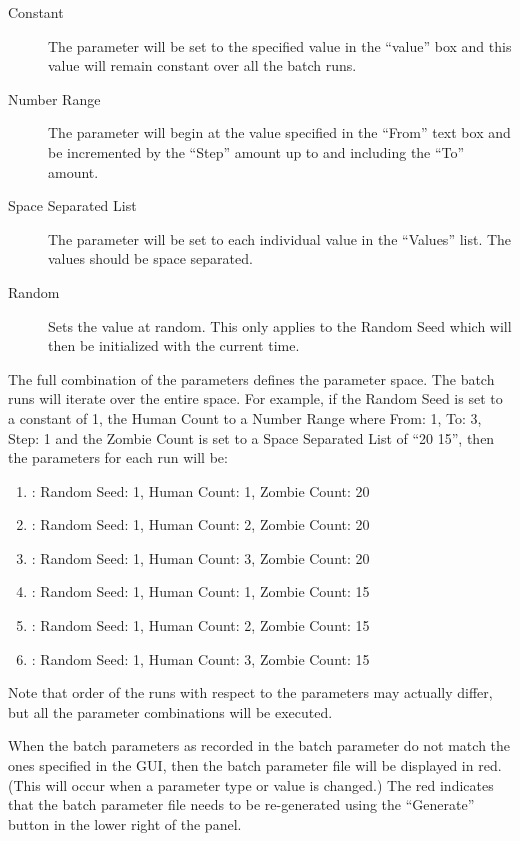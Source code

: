 \documentclass[11pt]{amsart}
\begin{document}
\begin{description}
\item[Constant] The parameter will be set to the specified value in the ``value'' box and this value will remain constant over all the batch runs.
\item[Number Range] The parameter will begin at the value specified in the ``From'' text box and be incremented by the ``Step'' amount up to and including the ``To'' amount. 
\item[Space Separated List] The parameter will be set to each individual value in the ``Values'' list. The values should be space separated.
\item[Random] Sets the value at random. This only applies to the Random Seed which will then be initialized with the current time.
\end{description}

The full combination of the parameters defines the parameter space. The batch runs will iterate over the entire space. For example, if the 
Random Seed is set to a constant of 1, the Human Count to a Number Range where From: 1, To: 3, Step: 1 and the Zombie Count is set to a Space Separated List of ``20 15'', then the parameters for each run will be:

\begin{enumerate}
\item: Random Seed: 1, Human Count: 1, Zombie Count: 20
\item: Random Seed: 1, Human Count: 2, Zombie Count: 20
\item: Random Seed: 1, Human Count: 3, Zombie Count: 20
\item: Random Seed: 1, Human Count: 1, Zombie Count: 15
\item: Random Seed: 1, Human Count: 2, Zombie Count: 15
\item: Random Seed: 1, Human Count: 3, Zombie Count: 15
\end{enumerate}

Note that order of the runs with respect to the parameters may actually differ, but all the parameter combinations will be executed.

When the batch parameters as recorded in the batch parameter do not match the ones specified in the GUI, then the batch parameter file will be displayed in red.  (This will occur when a parameter type or value is changed.) The red indicates that the batch parameter file needs to be re-generated using the ``Generate'' button in the lower right of the panel.
\end{document}
